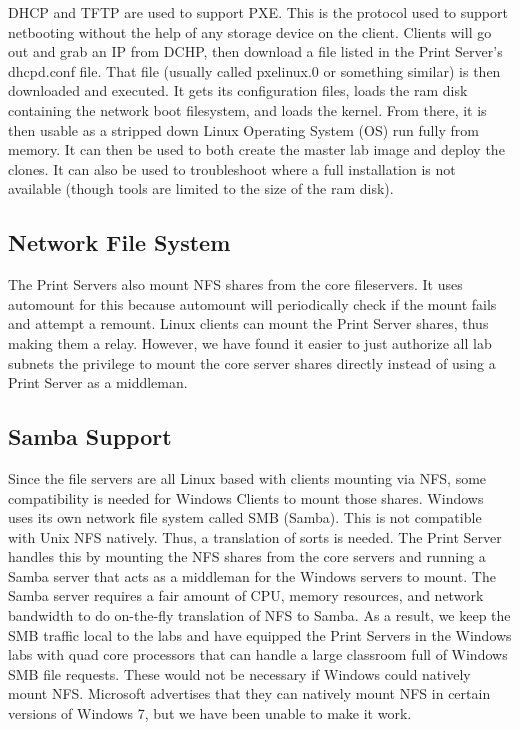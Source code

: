 DHCP and TFTP are used to support PXE.  This is the protocol used to support netbooting without the help of any storage device on the client.  Clients will go out and grab an IP from DCHP, then download a file listed in the Print Server's dhcpd.conf file.  That file (usually called pxelinux.0 or something similar) is then downloaded and executed.  It gets its configuration files, loads the ram disk containing the network boot filesystem, and loads the kernel.  From there, it is then usable as a stripped down Linux Operating System (OS) run fully from memory.  It can then be used to both create the master lab image and deploy the clones.  It can also be used to troubleshoot where a full installation is not available (though tools are limited to the size of the ram disk).

\subsection{Network File System}
The Print Servers also mount NFS shares from the core fileservers.  It uses automount for this because automount will periodically check if the mount fails and attempt a remount.  Linux clients can mount the Print Server shares, thus making them a relay.  However, we have found it easier to just authorize all lab subnets the privilege to mount the core server shares directly instead of using a Print Server as a middleman.  

\subsection{Samba Support}
Since the file servers are all Linux based with clients mounting via NFS, some compatibility is needed for Windows Clients to mount those shares.  Windows uses its own network file system called SMB (Samba).  This is not compatible with Unix NFS natively.  Thus, a translation of sorts is needed.  The Print Server handles this by mounting the NFS shares from the core servers and running a Samba server that acts as a middleman for the Windows servers to mount.  The Samba server requires a fair amount of CPU, memory resources, and network bandwidth to do on-the-fly translation of NFS to Samba. As a result, we keep the SMB traffic local to the labs and have equipped the Print Servers in the Windows labs with quad core processors that can handle a large classroom full of Windows SMB file requests. These would not be necessary if Windows could natively mount NFS. Microsoft advertises that they can natively mount NFS in certain versions of Windows 7, but we have been unable to make it work.

